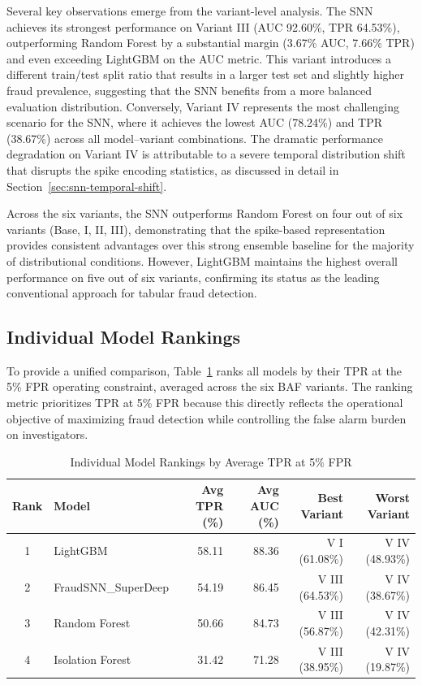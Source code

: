 Several key observations emerge from the variant-level analysis. The SNN achieves its strongest performance on Variant III (AUC 92.60\%, TPR 64.53\%), outperforming Random Forest by a substantial margin (3.67\% AUC, 7.66\% TPR) and even exceeding LightGBM on the AUC metric. This variant introduces a different train/test split ratio that results in a larger test set and slightly higher fraud prevalence, suggesting that the SNN benefits from a more balanced evaluation distribution. Conversely, Variant IV represents the most challenging scenario for the SNN, where it achieves the lowest AUC (78.24\%) and TPR (38.67\%) across all model--variant combinations. The dramatic performance degradation on Variant IV is attributable to a severe temporal distribution shift that disrupts the spike encoding statistics, as discussed in detail in Section~\ref{sec:snn-temporal-shift}.

Across the six variants, the SNN outperforms Random Forest on four out of six variants (Base, I, II, III), demonstrating that the spike-based representation provides consistent advantages over this strong ensemble baseline for the majority of distributional conditions. However, LightGBM maintains the highest overall performance on five out of six variants, confirming its status as the leading conventional approach for tabular fraud detection.

\subsection{Individual Model Rankings}

To provide a unified comparison, Table~\ref{tab:snn-rankings} ranks all models by their TPR at the 5\% FPR operating constraint, averaged across the six BAF variants. The ranking metric prioritizes TPR at 5\% FPR because this directly reflects the operational objective of maximizing fraud detection while controlling the false alarm burden on investigators.

\begin{table}[H]
\centering
\caption{Individual Model Rankings by Average TPR at 5\% FPR}
\label{tab:snn-rankings}
\small
\begin{tabularx}{0.92\textwidth}{cXrrrr}
\toprule
\textbf{Rank} & \textbf{Model} & \textbf{Avg TPR (\%)} & \textbf{Avg AUC (\%)} & \textbf{Best Variant} & \textbf{Worst Variant} \\
\midrule
1 & LightGBM & 58.11 & 88.36 & V I (61.08\%) & V IV (48.93\%) \\
2 & FraudSNN\_SuperDeep & 54.19 & 86.45 & V III (64.53\%) & V IV (38.67\%) \\
3 & Random Forest & 50.66 & 84.73 & V III (56.87\%) & V IV (42.31\%) \\
4 & Isolation Forest & 31.42 & 71.28 & V III (38.95\%) & V IV (19.87\%) \\
\bottomrule
\end{tabularx}
\end{table}

